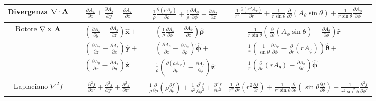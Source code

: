 \begin{table}[!ht]
{\begin{tabular}{|c|c|c|c|}
\hline 
\rule{0pt}{20pt}
Divergenza $\nabla \cdot \bold{A}$ & $\frac{\partial A_x}{\partial x}+\frac{\partial A_y}{\partial y}+\frac{\partial A_z}{\partial z}$& $\frac{1}{\rho} \frac{\partial\left(\rho A_\rho\right)}{\partial \rho}+\frac{1}{\rho} \frac{\partial A_\phi}{\partial \phi}+\frac{\partial A_z}{\partial z}$ & $\frac{1}{r^2} \frac{\partial\left(r^2 A_r\right)}{\partial r}+\frac{1}{r \sin \theta} \frac{\partial}{\partial \theta}\left(A_\theta \sin \theta\right)+\frac{1}{r \sin \theta} \frac{\partial A_\phi}{\partial \phi}$ \\
\hline
\rule{0pt}{60pt}
Rotore $\nabla \times \bold{A}$ & $\begin{aligned} & \left(\frac{\partial A_z}{\partial y}-\frac{\partial A_y}{\partial z}\right) \hat{\mathbf{x}}+ \\ & \left(\frac{\partial A_x}{\partial z}-\frac{\partial A_z}{\partial x}\right) \hat{\mathbf{y}}+ \\ & \left(\frac{\partial A_y}{\partial x}-\frac{\partial A_x}{\partial y}\right) \hat{\mathbf{z}}\end{aligned}$ & $\begin{gathered}\left(\frac{1}{\rho} \frac{\partial A_z}{\partial \phi}-\frac{\partial A_\phi}{\partial z}\right) \hat{\boldsymbol{\rho}}+ \\ \left(\frac{\partial A_\rho}{\partial z}-\frac{\partial A_z}{\partial \rho}\right) \hat{\boldsymbol{\phi}}+ \\ \frac{1}{\rho}\left(\frac{\partial\left(\rho A_\phi\right)}{\partial \rho}-\frac{\partial A_\rho}{\partial \phi}\right) \hat{\boldsymbol{z}}\end{gathered}$ & $\begin{gathered}\frac{1}{r \sin \theta}\left(\frac{\partial}{\partial \theta}\left(A_\phi \sin \theta\right)-\frac{\partial A_\theta}{\partial \phi}\right) \hat{\boldsymbol{r}}+ \\ \frac{1}{r}\left(\frac{1}{\sin \theta} \frac{\partial A_r}{\partial \phi}-\frac{\partial}{\partial r}\left(r A_\phi\right)\right) \hat{\boldsymbol{\theta}}+ \\ \frac{1}{r}\left(\frac{\partial}{\partial r}\left(r A_\theta\right)-\frac{\partial A_r}{\partial \theta}\right) \hat{\boldsymbol{\phi}}\end{gathered}$ \\
\hline
\rule{0pt}{30pt}
Laplaciano $\nabla^2f$& $\frac{\partial^2 f}{\partial x^2}+\frac{\partial^2 f}{\partial y^2}+\frac{\partial^2 f}{\partial z^2}$ & $\frac{1}{\rho} \frac{\partial}{\partial \rho}\left(\rho \frac{\partial f}{\partial \rho}\right)+\frac{1}{\rho^2} \frac{\partial^2 f}{\partial \phi^2}+\frac{\partial^2 f}{\partial z^2}$ & $\frac{1}{r^2} \frac{\partial}{\partial r}\left(r^2 \frac{\partial f}{\partial r}\right)+\frac{1}{r^2 \sin \theta} \frac{\partial}{\partial \theta}\left(\sin \theta \frac{\partial f}{\partial \theta}\right)+\frac{1}{r^2 \sin ^2 \theta} \frac{\partial^2 f}{\partial \phi^2}$ \\ 

\end{tabular}}
\end{table}
